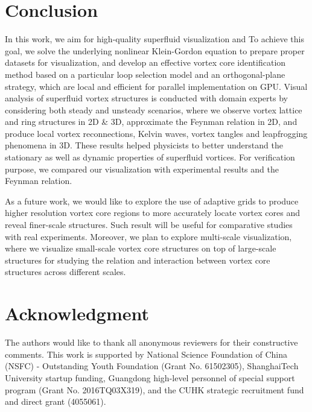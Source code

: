 \documentclass[10pt,journal,compsoc,twoside]{IEEEtran}
\newcommand{\rd}[1]{{\color[rgb]{0.0,0.0,0.0}{#1}}}
\begin{document}
	\section{Conclusion}
	\label{sec:conclusion}
	
	In this work, we aim for high-quality superfluid visualization and \rd{to help our collaborators visually study superfluid vortices.}
	To achieve this goal, we solve the underlying nonlinear Klein-Gordon equation to prepare proper datasets for visualization, and develop an effective vortex core identification method based on a particular loop selection model and an orthogonal-plane strategy, which are local and efficient for parallel implementation on GPU.
	Visual analysis of superfluid vortex structures is conducted with domain experts by considering both steady and unsteady scenarios, where we observe vortex lattice and ring structures in 2D \& 3D, approximate the Feynman relation in 2D, and produce local vortex reconnections, Kelvin waves, vortex tangles and leapfrogging phenomena in 3D.
	These results helped physicists to better understand the stationary as well as dynamic properties of superfluid vortices.
	For verification purpose, we compared our visualization with experimental results and the Feynman relation.
	
	As a future work, we would like to explore the use of adaptive grids to produce higher resolution vortex core regions to more accurately locate vortex cores and reveal finer-scale structures.
	Such result will be useful for comparative studies with real experiments.
	Moreover, we plan to explore multi-scale visualization, where we visualize small-scale vortex core structures on top of large-scale structures for studying the relation and interaction between vortex core structures across different scales.
	
	\section*{Acknowledgment}
	The authors would like to thank all anonymous reviewers for their constructive comments.
	This work is supported by National Science Foundation of China (NSFC) - Outstanding Youth Foundation (Grant No. 61502305), ShanghaiTech University startup funding, Guangdong high-level personnel of special support program (Grant No. 2016TQ03X319), and the CUHK strategic recruitment fund and direct grant (4055061).


	
	
\end{document}
